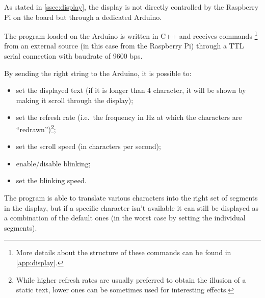 As stated in \autoref{ssec:display}, the display is not directly controlled by
the Raspberry Pi on the board but through a dedicated Arduino.

The program loaded on the Arduino is written in C++ and receives commands%
\footnote{More details about the structure of these commands can be found in
\autoref{app:display}.} from an external source (in this case from the Raspberry
Pi) through a TTL serial connection with baudrate of 9600 bps.

\beforelist By sending the right string to the Arduino, it is possible to:
\begin{itemize}
\item set the displayed text (if it is longer than 4 character, it will be
  shown by making it scroll through the display);
\item set the refresh rate (i.e.\ the frequency in Hz at which the characters
  are ``redrawn'')\footnote{While higher refresh rates are usually preferred to
  obtain the illusion of a static text, lower ones can be sometimes used for
  interesting effects.};
\item set the scroll speed (in characters per second);
\item enable/disable blinking;
\item set the blinking speed.
\end{itemize}
\afterlist*
The program is able to translate various characters into the right set of
segments in the display, but if a specific character isn't available it can
still be displayed as a combination of the default ones (in the worst case by
setting the individual segments).
